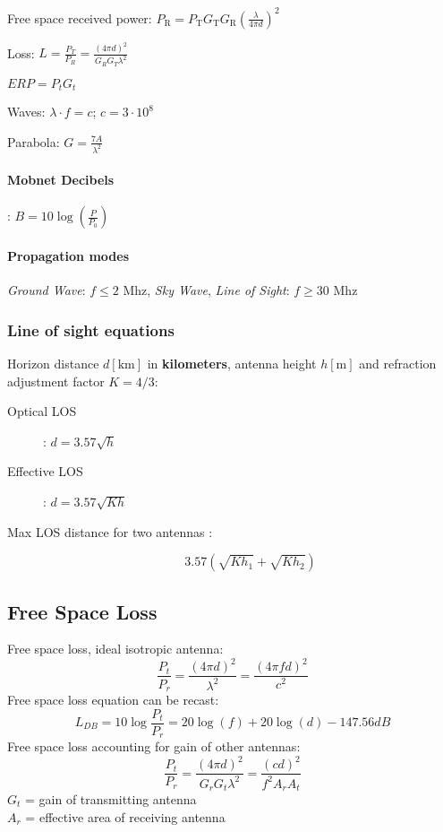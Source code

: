 \documentclass[6pt]{scrartcl}
\begin{document}
\begin{multicols}{4}
Free space received power: $P_\textrm{R} =  P_\textrm{T}G_\textrm{T}G_\textrm{R}(\frac{\lambda}{4\pi d})^2$

Loss: $L = \frac{P_T}{P_R} = \frac{(4\pi d)^2}{G_RG_T\lambda^2} $

$ERP = P_t G_t$

Waves: $\lambda \cdot f = c$; $ c = 3 \cdot 10^8 $

Parabola: $G = \frac{7A}{\lambda^2}$

\paragraph{Mobnet Decibels}:
$B = 10\log(\frac{P}{P_0})$

\paragraph{Propagation modes}
\emph{Ground Wave}: $f \le 2$ Mhz, \emph{Sky Wave}, \emph{Line of Sight}: $f \ge 30$ Mhz

\subsubsection{Line of sight equations}
Horizon distance $d[\textrm{km}]$ in \textbf{kilometers}, antenna height $h[\textrm{m}]$ and refraction adjustment factor $K = 4/3$:
\begin{description}
\item[Optical LOS]: $d = 3.57\sqrt{h}$
\item[Effective LOS]: $d = 3.57\sqrt{Kh}$
\item[Max LOS distance for two antennas :] $$3.57(\sqrt{Kh_1}+ \sqrt{Kh_2})$$
\end{description}


\subsection{Free Space Loss}

Free space loss, ideal isotropic antenna:
$$ \frac{P_t}{P_r} = \frac{(4\pi d)^2}{\lambda^2} = \frac{(4\pi fd)^2}{c^2} $$
Free space loss equation can be recast:
$$L_{DB} = 10\log \frac{P_t}{P_r} = 20 \log(f) +20\log(d) - 147.56 dB$$
Free space loss accounting for gain of other antennas: 
$$\frac{P_t}{P_r} = \frac{(4\pi d)^2}{G_rG_t\lambda^2} = \frac{(cd)^2}{f^2A_rA_t}$$
$G_t$ = gain of transmitting antenna\\
$A_r$ = effective area of receiving antenna


\end{multicols}
\end{document}
